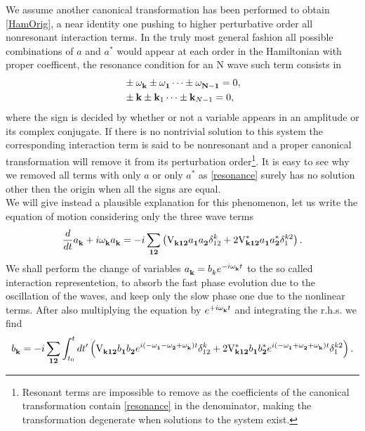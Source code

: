 We assume another canonical transformation has been performed to obtain \eqref{HamOrig}, a near identity one
pushing to higher perturbative order all nonresonant interaction terms. In the truly most general fashion all possible combinations of $a$ and $a^*$ 
would appear at each order in the Hamiltonian with proper coefficent, the resonance condition for an N wave such term consists in
\begin{align}
    &\pm \omega^{}_{\mathbf{k}} \pm \omega^{}_\mathbf{1} \dots \pm \omega^{}_\mathbf{N-1} = 0, \label{resonance}\\
    &\pm \mathbf{k} \pm \mathbf{k}_1 \dots \pm \mathbf{k}_{N-1} = 0,
\end{align}
where the sign is decided by whether or not a variable appears in an amplitude or its complex conjugate. If there is no nontrivial solution to this system the corresponding 
interaction term is said to be nonresonant and a proper canonical transformation will remove it from its perturbation order\footnote{
    Resonant terms are impossible to remove as the coefficients of the canonical transformation contain \eqref{resonance} in the denominator,
making the transformation degenerate when solutions to the system exist.
}. It is easy to see why we removed all terms
with only $a$ or only $a^*$ as \eqref{resonance} surely has no solution other then the origin when all the signs are equal.\\
We will give instead a plausible explanation for this phenomenon, let us write the equation of motion considering only the three wave terms
\begin{equation}
    \frac{d}{dt} a_\mathbf{k}^{} + i \omega^{}_{\mathbf{k}} a_\mathbf{k}^{} = -i\sum_{\mathbf{12}} \left( \mathrm{V}_{\mathbf{k12}}^{} a_\mathbf{1}^{} a_\mathbf{2}^{} \delta^{k}_{12} + 2 
    \mathrm{V}^*_\mathbf{k12}a_\mathbf{1}^{} a_\mathbf{2}^{*} \delta^{k2}_{1}  \right).
\end{equation}
We shall perform the change of variables $a_\mathbf{k}^{} = b_k^{} e^{-i\omega^{}_{\mathbf{k}} t}$ to the so called interaction representetion,
 to absorb the fast phase evolution due to the oscillation of the waves, and keep only the slow phase 
one due to the nonlinear terms. After also multiplying the equation by $e^{+i\omega^{}_{\mathbf{k}} t}$ and integrating the r.h.s. we find
\begin{equation}
    b_\mathbf{k}^{}= -i\sum_{\mathbf{12}} \int_{t_0}^{t} dt'\left( \mathrm{V}_{\mathbf{k12}}^{} b_\mathbf{1}^{} b_\mathbf{2}^{}e^{i(-\omega^{}_\mathbf{1} - \omega^{}_\mathbf{2}
     + \omega^{}_{\mathbf{k}})t} \delta^{k}_{12} 
    + 2 \mathrm{V}^*_\mathbf{k12}b_\mathbf{1}^{} b_\mathbf{2}^{*}e^{i(-\omega^{}_\mathbf{1} + \omega^{}_\mathbf{2}+ \omega^{}_{\mathbf{k}})t} \delta^{k2}_{1}  \right).
\end{equation}
